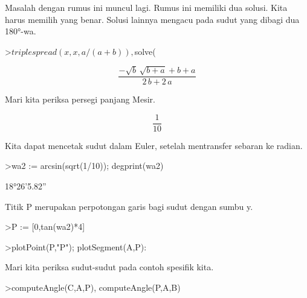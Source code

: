 \documentclass[a4paper,10pt]{article}
\begin{document}
\begin{eulernotebook}
\begin{eulercomment}
\begin{eulercomment}
\begin{eulercomment}
\begin{eulercomment}
\begin{eulercomment}
\begin{eulercomment}
\begin{eulercomment}
\begin{eulercomment}
\begin{eulercomment}
\begin{eulercomment}
\begin{eulercomment}
\begin{eulercomment}
\begin{eulercomment}
\begin{eulercomment}
\begin{eulercomment}
\begin{eulercomment}
\begin{eulercomment}
\begin{eulercomment}
\begin{eulercomment}
Masalah dengan rumus ini muncul lagi. Rumus ini memiliki dua solusi.
Kita harus memilih yang benar. Solusi lainnya mengacu pada sudut yang
dibagi dua 180°-wa.
\end{eulercomment}
\begin{eulerprompt}
>$triplespread(x,x,a/(a+b)), $solve(%
\end{eulerprompt}
\begin{eulerformula}
\[
\frac{-\sqrt{b}\,\sqrt{b+a}+b+a}{2\,b+2\,a}
\]
\end{eulerformula}
\begin{eulercomment}
Mari kita periksa persegi panjang Mesir.
\end{eulercomment}
\begin{eulerformula}
\[
\frac{1}{10}
\]
\end{eulerformula}
\begin{eulercomment}
Kita dapat mencetak sudut dalam Euler, setelah mentransfer sebaran ke
radian.
\end{eulercomment}
\begin{eulerprompt}
>wa2 := arcsin(sqrt(1/10)); degprint(wa2)
\end{eulerprompt}
\begin{euleroutput}
  18°26'5.82''
\end{euleroutput}
\begin{eulercomment}
Titik P merupakan perpotongan garis bagi sudut dengan sumbu y.
\end{eulercomment}
\begin{eulerprompt}
>P := [0,tan(wa2)*4]
\end{eulerprompt}
\begin{euleroutput}
  [0,  1.33333]
\end{euleroutput}
\begin{eulerprompt}
>plotPoint(P,"P"); plotSegment(A,P):
\end{eulerprompt}
\begin{eulercomment}
Mari kita periksa sudut-sudut pada contoh spesifik kita.
\end{eulercomment}
\begin{eulerprompt}
>computeAngle(C,A,P), computeAngle(P,A,B)

\end{eulerprompt}
\end{eulercomment}
\end{eulercomment}
\end{eulercomment}
\end{eulercomment}
\end{eulercomment}
\end{eulercomment}
\end{eulercomment}
\end{eulercomment}
\end{eulercomment}
\end{eulercomment}
\end{eulercomment}
\end{eulercomment}
\end{eulercomment}
\end{eulercomment}
\end{eulercomment}
\end{eulercomment}
\end{eulercomment}
\end{eulercomment}
\end{eulernotebook}
\end{document}
